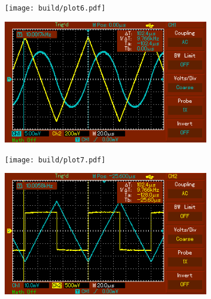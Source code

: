 \begin{figure}
  \centering
    \begin{subfigure}{0.48\textwidth}
      \centering
      \texttt{[image: build/plot6.pdf]}
      \label{fig:dreckplt}
    \end{subfigure}
    \begin{subfigure}{0.48\textwidth}
      \centering
      \includegraphics[width=\textwidth]{integration/MAP003.png}
      \label{fig:dreckgms}
  \end{subfigure} \end{figure}

  \begin{figure}
    \centering
    \begin{subfigure}{0.48\textwidth}
      \centering
      \texttt{[image: build/plot7.pdf]}
      \label{fig:vierplt}
    \end{subfigure}
    \begin{subfigure}{0.48\textwidth}
      \centering
      \includegraphics[width=\textwidth]{integration/MAP004.png}
      \label{fig:viergms}
    \end{subfigure} \end{figure}
